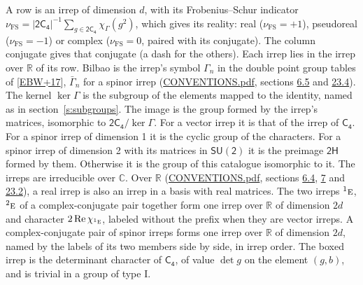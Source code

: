 \documentclass[10pt,a4paper]{article}
\numberwithin{equation}{section}
\newcommand{\grp}[1]{\mathsf{#1}}
\newcommand{\irr}[1]{\text{\normalfont\scshape #1}}
\newcommand{\conjpair}[1]{{}^{#1}}
\newcommand{\irchar}[1]{\chi_{#1}}
\newcommand{\fsind}{\nu_{\mathrm{FS}}}
\begin{document}
\leavevmode\label{n:index.frobenius}\label{n:head.irrep}\label{n:head.reality}A row is an irrep of dimension $d$, with its Frobenius--Schur indicator $\fsind = |\grp{2C_{4}}|^{-1}\allowbreak\sum_{g\in\grp{2C_{4}}}\irchar{\Gamma}(g^2)$, which gives its reality: real ($\fsind = +1$), pseudoreal ($\fsind = -1$) or complex ($\fsind = 0$, paired with its conjugate). \label{n:head.conjugate}The column conjugate gives that conjugate (a dash for the others). \label{n:head.over.real}Each irrep lies in the irrep over $\mathbb{R}$ of its row. \label{n:head.bilbao}\label{n:irrep.alias.gamma}Bilbao is the irrep's symbol $\Gamma_n$ in the double point group tables of [\href{../../../REFERENCES.pdf\#ref.EBW+17}{EBW+17}], $\bar{\Gamma}_n$ for a spinor irrep (\href{../../CONVENTIONS.pdf}{CONVENTIONS.pdf}, sections \href{../../../rotation/CONVENTIONS.pdf\#conv.6.5}{6.5} and \href{../../CONVENTIONS.pdf\#conv.23.4}{23.4}). \label{n:head.kernel}The kernel $\ker\Gamma$ is the subgroup of the elements mapped to the identity, named as in section~\ref{s:subgroups}. \label{n:head.image}The image is the group formed by the irrep's matrices, isomorphic to $\grp{2C_{4}}/\ker\Gamma$. For a vector irrep it is that of the irrep of \href{../../../rotation/data/pdf/C4.pdf}{$\grp{C_{4}}$}. For a spinor irrep of dimension 1 it is the cyclic group of the characters. For a spinor irrep of dimension 2 with its matrices in $\grp{SU(2)}$ it is the preimage $\grp{2H}$ formed by them. Otherwise it is the group of this catalogue isomorphic to it. The irreps are irreducible over $\mathbb{C}$. Over $\mathbb{R}$ (\href{../../CONVENTIONS.pdf}{CONVENTIONS.pdf}, sections \href{../../../rotation/CONVENTIONS.pdf\#conv.6.4}{6.4}, \href{../../../rotation/CONVENTIONS.pdf\#conv.7}{7} and \href{../../CONVENTIONS.pdf\#conv.23.2}{23.2}), a real irrep is also an irrep in a basis with real matrices. The two irreps $\conjpair{1}\irr{e}$, $\conjpair{2}\irr{e}$ of a complex-conjugate pair together form one irrep over $\mathbb{R}$ of dimension $2d$ and character $2\operatorname{Re}\irchar{\conjpair{1}\irr{e}}$, labeled without the prefix when they are vector irreps. A complex-conjugate pair of spinor irreps forms one irrep over $\mathbb{R}$ of dimension $2d$, named by the labels of its two members side by side, in irrep order. \label{n:mark.determinant}The boxed irrep is the determinant character of \href{../../../rotation/data/pdf/C4.pdf}{$\grp{C_{4}}$}, of value $\det g$ on the element $(g, b)$, and is trivial in a group of type I.
\setlength{\emergencystretch}{2em}\par\setlength{\emergencystretch}{0pt}
\end{document}
